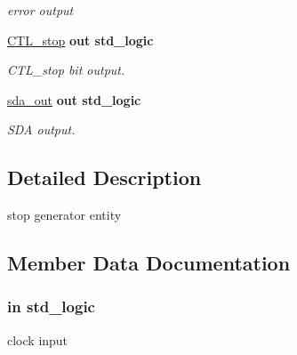 \begin{DoxyCompactItemize}
\begin{DoxyCompactList}\small\item\em error output \end{DoxyCompactList}\item 
\hyperlink{classstop__generator_a3db880d8471bea3cebf8bdef74be6434}{C\+T\+L\+\_\+stop}  {\bfseries {\bfseries \textcolor{vhdlchar}{out}\textcolor{vhdlchar}{ }}} {\bfseries \textcolor{vhdlchar}{std\+\_\+logic}\textcolor{vhdlchar}{ }} 
\begin{DoxyCompactList}\small\item\em C\+T\+L\+\_\+stop bit output. \end{DoxyCompactList}\item 
\hyperlink{classstop__generator_a225745186aee8a36d9f0f5a266e3ea6e}{sda\+\_\+out}  {\bfseries {\bfseries \textcolor{vhdlchar}{out}\textcolor{vhdlchar}{ }}} {\bfseries \textcolor{vhdlchar}{std\+\_\+logic}\textcolor{vhdlchar}{ }} 
\begin{DoxyCompactList}\small\item\em S\+DA output. \end{DoxyCompactList}\end{DoxyCompactItemize}


\subsection{Detailed Description}
stop generator entity 

\subsection{Member Data Documentation}
\subsubsection[{\texorpdfstring{clk}{clk}}]{ {\bfseries \textcolor{vhdlchar}{in}\textcolor{vhdlchar}{ }} {\bfseries \textcolor{vhdlchar}{std\+\_\+logic}\textcolor{vhdlchar}{ }} \hspace{0.3cm}{\ttfamily [Port]}}\hypertarget{classstop__generator_a4a4609c199d30b3adebbeb3a01276ec5}{}\label{classstop__generator_a4a4609c199d30b3adebbeb3a01276ec5}


clock input 

